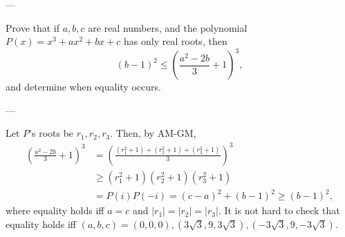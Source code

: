 
---

Prove that if $a,b,c$ are real numbers, and the polynomial $P(x)=x^3+ax^2+bx+c$ has only real roots, then \[(b-1)^2 \le \left(\frac{a^2-2b}{3}+1\right)^3,\]
and determine when equality occurs.

---

Let $P$'s roots be $r_1,r_2,r_3$. Then, by AM-GM,
\begin{align*}
    \left(\frac{a^2-2b}{3}+1\right)^3&=\left(\frac{(r_1^2+1)+(r_2^2+1)+(r_3^2+1)}{3}\right)^3\\
    &\ge (r_1^2 + 1)(r_2^2 + 1)(r_3^2+1)\\
    &=P(i)P(-i)=(c-a)^2+(b-1)^2\ge (b-1)^2,
\end{align*}
where equality holds iff $a=c$ and $|r_1|=|r_2|=|r_3|$. It is not hard to check that equality holds iff $(a,b,c)=(0,0,0),(3\sqrt{3},9,3\sqrt{3}),(-3\sqrt{3},9,-3\sqrt{3})$.

